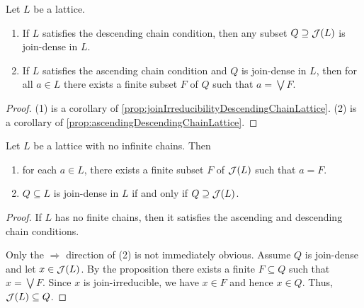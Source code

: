 \begin{proposition}
Let $L$ be a lattice.
\begin{enumerate}
\item If $L$ satisfies the descending chain condition, then any subset $Q\supseteq \mathop{\mathcal{J}}(L)$ is join-dense in $L$.
\item If $L$ satisfies the ascending chain condition and $Q$ is join-dense in $L$, then for all $a\in L$ there exists a finite subset $F$ of $Q$ such that $a = \bigvee F$.
\end{enumerate}
\end{proposition}
\begin{proof}
(1) is a corollary of \ref{prop:joinIrreducibilityDescendingChainLattice}. (2) is a corollary of \ref{prop:ascendingDescendingChainLattice}.
\end{proof}
\begin{corollary}
Let $L$ be a lattice with no infinite chains. Then
\begin{enumerate}
\item for each $a \in L$, there exists a finite subset $F$ of $\mathop{\mathcal{J}}(L)$ such that $a = F$.
\item $Q\subseteq L$ is join-dense in $L$ if and only if $Q \supseteq \mathop{\mathcal{J}}(L)$.
\end{enumerate}
\end{corollary}
\begin{proof}
If $L$ has no finite chains, then it satisfies the ascending and descending chain conditions.

Only the $\Rightarrow$ direction of (2) is not immediately obvious. Assume $Q$ is join-dense and let $x\in \mathop{\mathcal{J}}(L)$. By the proposition there exists a finite $F\subseteq Q$ such that $x = \bigvee F$. Since $x$ is join-irreducible, we have $x \in F$ and hence $x \in Q$. Thus, $\mathop{\mathcal{J}}(L) \subseteq Q$.
\end{proof}


